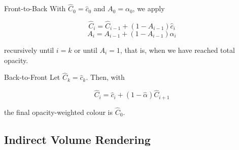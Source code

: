 \documentclass[english]{panikzettel}
\begin{document}
\begin{halfboxl}
\vspace{-\baselineskip}
\begin{defi}{Front-to-Back}
With $\hat C_0 = \hat c_0$ and $A_0 = \alpha_0$, we apply

$$\hat C_i = \hat C_{i-1} + (1 - A_{i-1}) \hat c_i$$
$$A_i = A_{i-1} + (1 - A_{i-1}) \alpha_i$$

recursively until $i = k$ or until $A_i = 1$, that is, when we have reached total opacity.
\end{defi}
\end{halfboxl}%
\begin{halfboxr}
\vspace{-\baselineskip}
\begin{defi}{Back-to-Front}
Let $\hat C_k = \hat c_k$. Then, with

$$\hat C_i = \hat c_i + (1 - \hat \alpha) \hat C_{i+1}$$

the final opacity-weighted colour is $\hat C_0$.
\end{defi}
\end{halfboxr}

\subsection{Indirect Volume Rendering}
\end{document}
